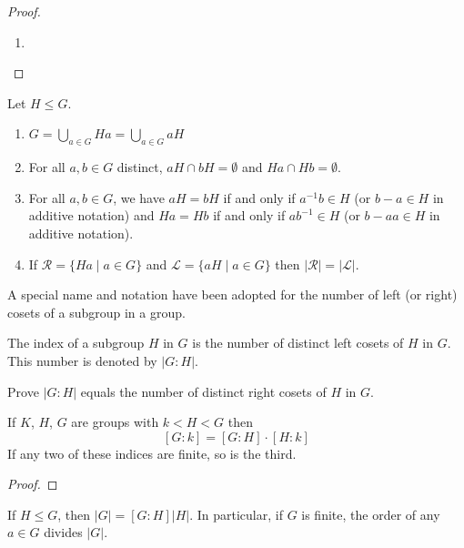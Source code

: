 \documentclass[11pt,a4paper]{article}
\begin{document}
\begin{proof}
\begin{enumerate}[label=(\roman*)]
    \item 
\end{enumerate}
\end{proof}


\begin{cor}
Let \(H\leq G\).
\begin{enumerate}[label=(\roman*)]
    \item      \( G = \bigcup\limits_{a \in G} Ha = \bigcup\limits_{a \in G} aH \)
    \item For all \(a,b\in G\) distinct, \( aH \cap bH = \emptyset \) and \( Ha \cap Hb = \emptyset \).
    \item For all \(a,b\in G\), we have \( aH = bH \) if and only if \( a^{-1}b \in H \) (or \( b-a \in H \) in additive notation)  and \( Ha = Hb \) if and only if \( ab^{-1} \in H \) (or \( b-a a \in H \) in additive notation).
    \item If \( \mathcal{R} = \{ Ha \mid a \in G \} \) and \( \mathcal{L} = \{ aH \mid a \in G \} \) then \(|\mathcal{R}|=|\mathcal{L}|\).
\end{enumerate}
 
\end{cor}

A special name and notation have been adopted for the number of left (or right) cosets of a subgroup in a group.

\begin{defi}[Index]
    The index of a subgroup $H$ in $G$ is the number of distinct left cosets of $H$ in $G$. This number is denoted by $|G: H|$. 
\end{defi}

\begin{eje}
    Prove $|G: H|$ equals the number of distinct right cosets of $H$ in $G$.
\end{eje}

\begin{teo}
    If $K$, $H$, $G$ are groups  with $k<H<G$ then
\[
[G: k]=[G: H] \cdot[H: k]
\]
If any two of these indices are finite, so is the third.
\end{teo}


\begin{proof}
    
\end{proof}


\begin{cor}
    If \( H \leq G \), then \( |G| = [G : H] |H| \). 
In particular, if \( G \) is finite, the order of  any \( a \in G \) divides \( |G| \).
\end{cor}
\end{document}
